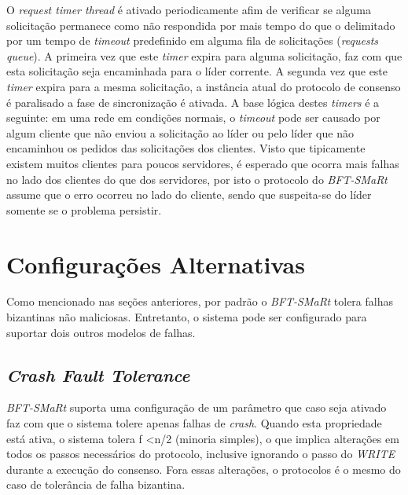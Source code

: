 	 O \textit{request timer thread} é ativado periodicamente afim de verificar se alguma solicitação permanece como não respondida por mais tempo do que o delimitado por um tempo de \textit{timeout} predefinido em alguma fila de solicitações (\textit{requests queue}). A primeira vez que este \textit{timer} expira para alguma solicitação, faz com que esta solicitação seja encaminhada para o líder corrente. A segunda vez que este \textit{timer} expira para a mesma solicitação, a instância atual do protocolo de consenso é paralisado a fase de sincronização é ativada. A base lógica destes \textit{timers} é a seguinte: em uma rede em condições normais, o \textit{timeout} pode ser causado por algum cliente que não enviou a solicitação ao líder ou pelo líder que não encaminhou os pedidos das solicitações dos clientes. Visto que tipicamente existem muitos clientes para poucos servidores, é esperado que ocorra mais falhas no lado dos clientes do que dos servidores, por isto o protocolo do \textit{BFT-SMaRt} assume que o erro ocorreu no lado do cliente, sendo que suspeita-se do líder somente se o problema persistir. \\
	 
	 \section{Configurações Alternativas}
	 
	 Como mencionado nas seções anteriores, por padrão o \textit{BFT-SMaRt} tolera falhas bizantinas não maliciosas. Entretanto, o sistema pode ser configurado para suportar dois outros modelos de falhas.\\
	 
	 	\subsection{\textit{Crash Fault Tolerance}}
	 	\textit{BFT-SMaRt} suporta uma configuração de um parâmetro que caso seja ativado faz com que o sistema tolere apenas falhas de \textit{crash}. Quando esta propriedade está ativa, o sistema tolera  f \textless  n/2 (minoria simples), o que implica alterações em todos os passos necessários do protocolo, inclusive ignorando o passo do \textit{WRITE} durante a execução do consenso. Fora essas alterações, o protocolos é o mesmo do caso de tolerância de falha bizantina. 
	 	
